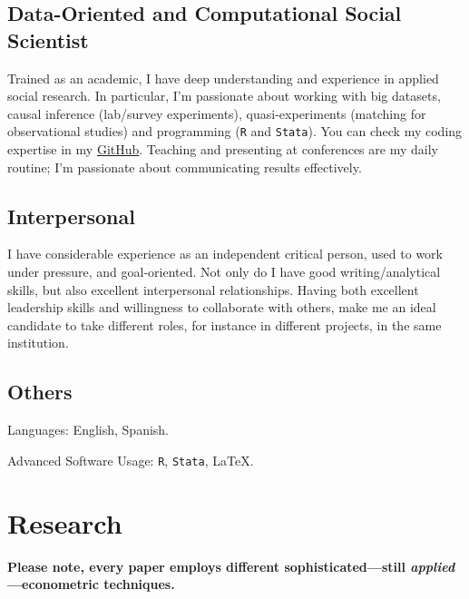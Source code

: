 \documentclass[letterpaper]{article}
\renewenvironment{itemize}{
  \begin{list}{}{
    \setlength{\leftmargin}{1.5em}
  }
}{
  \end{list}
}
\begin{document}
\subsection*{Data-Oriented and Computational Social Scientist}
Trained as an academic, I have deep understanding and experience in applied social research. In particular, I'm passionate about working with big datasets, causal inference (lab/survey experiments), quasi-experiments (matching for observational studies) and programming (\texttt{R} and \texttt{Stata}). You can check my coding expertise in my \href{https://github.com/hbahamonde}{GitHub}. Teaching and presenting at conferences are my daily routine; I'm passionate about communicating results effectively.

\subsection*{Interpersonal}
I have considerable experience as an independent critical person, used to work under pressure, and goal-oriented. Not only do I have good writing/analytical skills, but also excellent interpersonal relationships. Having both excellent leadership skills and willingness to collaborate with others, make me an ideal candidate to take different roles, for instance in different projects, in the same institution. 





\subsection*{Others}
\begin{itemize}
	\item Languages: English, Spanish.
	\item Advanced Software Usage: \texttt{R}, \texttt{Stata}, \LaTeX.
\end{itemize}


\section*{Research}

{\bf Please note, every paper employs different sophisticated---still \emph{applied}---econometric techniques.}

{}
\end{document}
